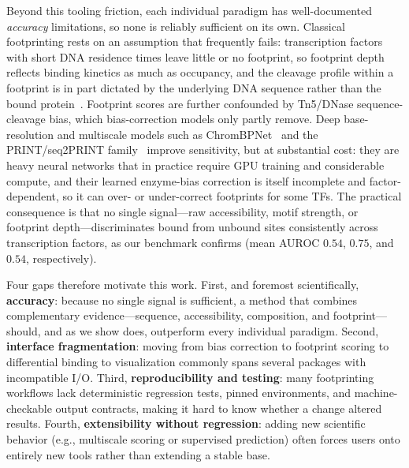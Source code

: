\documentclass[biomedinformatics,article,submit,pdftex,moreauthors]{Definitions/mdpi}
\begin{document}
Beyond this tooling friction, each individual paradigm has well-documented
\emph{accuracy} limitations, so none is reliably sufficient on its own. Classical
footprinting rests on an assumption that frequently fails: transcription factors
with short DNA residence times leave little or no footprint, so footprint depth
reflects binding kinetics as much as occupancy, and the cleavage profile within a
footprint is in part dictated by the underlying DNA sequence rather than the bound
protein~\cite{sung2014}. Footprint scores are further confounded by Tn5/DNase
sequence-cleavage bias, which bias-correction models only partly remove. Deep
base-resolution and multiscale models such as ChromBPNet~\cite{chrombpnet2024} and
the PRINT/seq2PRINT family~\cite{hu2024print} improve sensitivity, but at
substantial cost: they are heavy neural networks that in practice require GPU
training and considerable compute, and their learned enzyme-bias correction is
itself incomplete and factor-dependent, so it can over- or under-correct
footprints for some TFs. The practical consequence is that no single
signal---raw accessibility, motif strength, or footprint depth---discriminates
bound from unbound sites consistently across transcription factors, as our
benchmark confirms (mean AUROC $0.54$, $0.75$, and $0.54$, respectively).

Four gaps therefore motivate this work. First, and foremost scientifically,
\textbf{accuracy}: because no single signal is sufficient, a method that combines
complementary evidence---sequence, accessibility, composition, and
footprint---should, and as we show does, outperform every individual paradigm.
Second, \textbf{interface fragmentation}: moving from bias correction to footprint
scoring to differential binding to visualization commonly spans several packages
with incompatible I/O. Third, \textbf{reproducibility and testing}: many
footprinting workflows lack deterministic regression tests, pinned environments,
and machine-checkable output contracts, making it hard to know whether a change
altered results. Fourth, \textbf{extensibility without regression}: adding new
scientific behavior (e.g., multiscale scoring or supervised prediction) often
forces users onto entirely new tools rather than extending a stable base.
\end{document}
